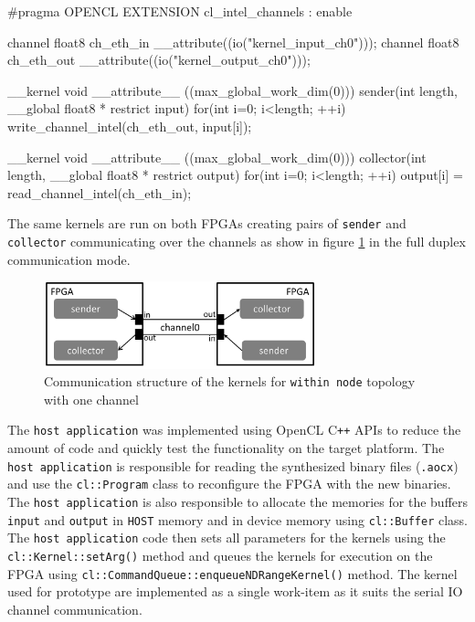 \begin{CppCode} [caption=Kernels for \texttt{within node} prototype, frame=tlrb, label=code:within_node, float]
#pragma OPENCL EXTENSION cl_intel_channels : enable

channel float8 ch_eth_in __attribute((io("kernel_input_ch0")));
channel float8 ch_eth_out __attribute((io("kernel_output_ch0")));

__kernel void __attribute__ ((max_global_work_dim(0)))
sender(int length, __global float8 * restrict input)
{
    for(int i=0; i<length; ++i)
        write_channel_intel(ch_eth_out, input[i]);
}

__kernel void __attribute__ ((max_global_work_dim(0)))
collector(int length, __global float8 * restrict output)
{
    for(int i=0; i<length; ++i)
        output[i] = read_channel_intel(ch_eth_in);
}
\end{CppCode}

The same kernels are run on both FPGAs creating pairs of \texttt{sender}
and \texttt{collector} communicating over the channels as show in
figure \ref{fig:send_rcv} in the full duplex communication mode.

\begin{figure}[h]%
    \centering
    \includegraphics[width=0.7\textwidth]{images/send_recv}
    \caption{Communication structure of the kernels for \texttt{within node} topology with one channel}
    \label{fig:send_rcv}
\end{figure}

The \texttt{host application} was implemented using OpenCL C\texttt{+}\texttt{+} APIs to reduce the amount
of code and quickly test the functionality on the target platform. The \texttt{host application}
is responsible for reading the synthesized binary files (\texttt{.aocx}) and use the
\texttt{cl::Program} class to reconfigure the FPGA with the new binaries. The \texttt{host application}
is also responsible to allocate the memories for the buffers \texttt{input} and
\texttt{output} in \texttt{HOST} memory and in device memory using \texttt{cl::Buffer} class.
The \texttt{host application} code then sets all parameters for the kernels using the \texttt{cl::Kernel::setArg()}
method and queues the kernels for execution on the FPGA using \texttt{cl::CommandQueue::enqueueNDRangeKernel()}
method. The kernel used for prototype are implemented as a single work-item as it suits the
serial IO channel communication.


